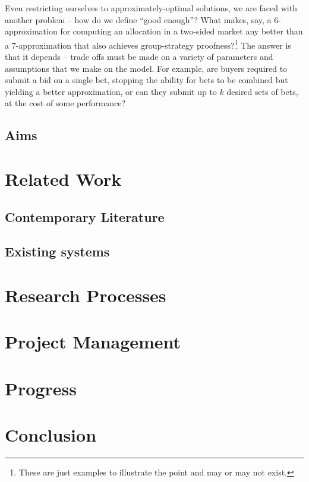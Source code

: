 \documentclass[10pt,a4paper]{article}
\theoremstyle{plain}
\theoremstyle{definition}
\begin{document}
	Even restricting ourselves to approximately-optimal solutions, we are faced
	with another problem -- how do we define ``good enough''? What makes, say,
	a 6-approximation for computing an allocation in a two-sided market any
	better than a 7-approximation that also achieves group-strategy
	proofness?\footnote{These are just examples to illustrate the point and may
	or may not exist.} The answer is that it depends -- trade offs must be made
	on a variety of parameters and assumptions that we make on the model. For
	example, are buyers required to submit a bid on a single bet, stopping the
	ability for bets to be combined but yielding a better approximation, or can
	they submit up to $k$ desired sets of bets, at the cost of some
	performance?

	\subsection{Aims}

\section{Related Work}
	\label{sec:relatedWork}

	\subsection{Contemporary Literature}
	\subsection{Existing systems}

\section{Research Processes}
	\label{sec:researchProcesses}

\section{Project Management}
	\label{sec:projectManagement}

\section{Progress}
	\label{sec:progress}

\section{Conclusion}
	\label{sec:conclusion}


\end{document}
